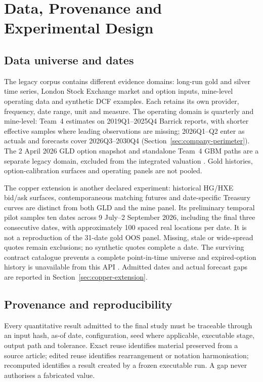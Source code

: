 \section{Data, Provenance and Experimental Design}
\label{sec:data-design}

\subsection{Data universe and dates}

The legacy corpus contains different evidence domains: long-run gold and silver
time series, London Stock Exchange market and option inputs, mine-level
operating data and synthetic DCF examples. Each retains its own provider,
frequency, date range, unit and measure. The operating domain is quarterly and
mine-level: Team~4 estimates on 2019Q1--2025Q4 Barrick reports, with shorter
effective samples where leading observations are missing; 2026Q1--Q2 enter
as actuals and forecasts cover 2026Q3--2030Q4
(Section~\ref{sec:company-perimeter}). The 2 April 2026 GLD option snapshot
and standalone Team~4 GBM paths are a separate legacy domain, excluded from
the integrated valuation \cite{team4}. Gold histories, option-calibration
surfaces and operating panels are not pooled.

The copper extension is another declared experiment: historical HG/HXE
bid/ask surfaces, contemporaneous matching futures and date-specific Treasury
curves are distinct from both GLD and the mine panel. Its preliminary temporal
pilot samples ten dates across 9 July--2 September 2026, including the final
three consecutive dates, with approximately 100 spaced real locations per
date. It is not a reproduction of the 31-date gold OOS panel. Missing, stale
or wide-spread quotes remain exclusions; no synthetic quotes complete a date.
The surviving contract catalogue prevents a complete point-in-time universe
and expired-option history is unavailable from this API
\cite{ib-historical-limitations}. Admitted dates and actual forecast gaps are
reported in Section~\ref{sec:copper-extension}.

\subsection{Provenance and reproducibility}

Every quantitative result admitted to the final study must be traceable through an input hash, as-of date, configuration, seed where applicable, executable stage, output path and tolerance. Exact reuse identifies material preserved from a source article; edited reuse identifies rearrangement or notation harmonisation; recomputed identifies a result created by a frozen executable run. A gap never authorises a fabricated value.

